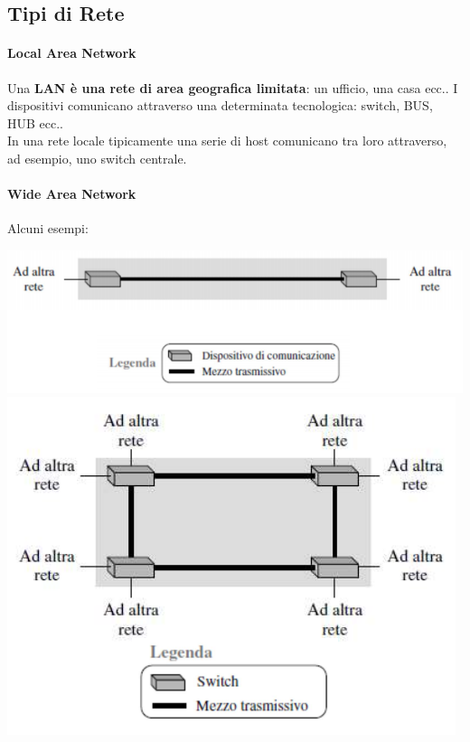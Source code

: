 \documentclass[10pt]{article}
\begin{document}
\subsection{Tipi di Rete}
\paragraph{Local Area Network} Una \textbf{LAN è una rete di area geografica limitata}: un ufficio, una casa ecc.. I dispositivi comunicano attraverso una determinata tecnologica: switch, BUS, HUB ecc..\\
In una rete locale tipicamente una serie di host comunicano tra loro attraverso, ad esempio, uno switch centrale.
\paragraph{Wide Area Network} Alcuni esempi:\\
\begin{multicols}{2}
\includegraphics[scale=0.5]{wan1.png}\\
\columnbreak
\includegraphics[scale=0.5]{wan2.png}\\
\end{multicols}
\end{document}
